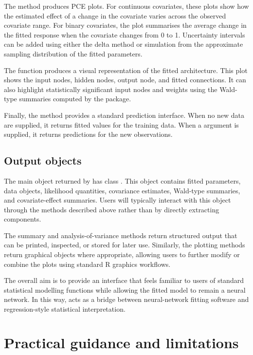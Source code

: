 The  method produces PCE plots.
For continuous covariates, these plots show how the estimated effect of a change in the covariate varies across the observed covariate range.
For binary covariates, the plot summarises the average change in the fitted response when the covariate changes from 0 to 1.
Uncertainty intervals can be added using either the delta method or simulation from the approximate sampling distribution of the fitted parameters.

The  function produces a visual representation of the fitted architecture.
This plot shows the input nodes, hidden nodes, output node, and fitted connections.
It can also highlight statistically significant input nodes and weights using the Wald-type summaries computed by the package.

Finally, the  method provides a standard prediction interface.
When no new data are supplied, it returns fitted values for the training data.
When a  argument is supplied, it returns predictions for the new observations.

\subsection{Output objects}\label{output-objects}

The main object returned by  has class .
This object contains fitted parameters, data objects, likelihood quantities, covariance estimates, Wald-type summaries, and covariate-effect summaries.
Users will typically interact with this object through the methods described above rather than by directly extracting components.

The summary and analysis-of-variance methods return structured output that can be printed, inspected, or stored for later use.
Similarly, the plotting methods return graphical objects where appropriate, allowing users to further modify or combine the plots using standard R graphics workflows.

The overall aim is to provide an interface that feels familiar to users of standard statistical modelling functions while allowing the fitted model to remain a neural network.
In this way,  acts as a bridge between neural-network fitting software and regression-style statistical interpretation.

\section{Practical guidance and limitations}\label{sec:limitations}

